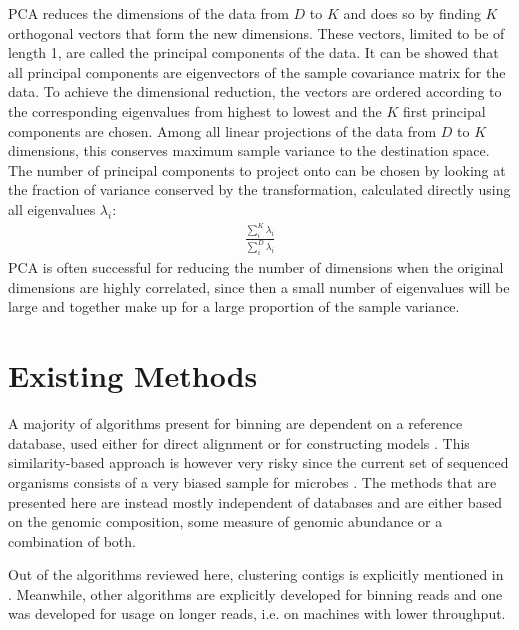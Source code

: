 PCA reduces the dimensions of the data from $D$ to $K$ and  does so by finding $K$ orthogonal vectors that form the new dimensions. These vectors, limited to be of length 1, are called the principal components of the data. It can be showed that all principal components are eigenvectors of the sample covariance matrix for the data. To achieve the dimensional reduction, the vectors are ordered according to the corresponding eigenvalues from highest to lowest and the $K$ first principal components are chosen. Among all linear projections of the data from $D$ to $K$ dimensions, this conserves maximum sample variance to the destination space. The number of principal components to project onto can be chosen by looking at the fraction of variance conserved by the transformation, calculated directly using all eigenvalues $\lambda_i$:
\begin{align*}
  \frac{\sum_i^K\lambda_i}{\sum_i^D \lambda_i}
\end{align*}
PCA is often successful for reducing the number of dimensions when the original dimensions are highly correlated, since then a small number of eigenvalues will be large and together make up for a large proportion of the sample variance. \parencite{Alpaydin2010}

\section{Existing Methods}
A majority of algorithms present for binning are dependent on a reference database, used either for direct alignment or for constructing models \parencite{Mande2012}. This similarity-based approach is however very risky since the current set of sequenced organisms consists of a very biased sample for microbes \parencite{Leung2011}. The methods that are presented here are instead mostly independent of databases and are either based on the genomic composition, some measure of genomic abundance or a combination of both. 

Out of the algorithms reviewed here, clustering contigs is explicitly mentioned in \parencite{Kelley2010,Weber2011, Wang2012, Strous2012a}. Meanwhile, other algorithms are explicitly developed for binning reads \parencite{Wu2011b,Tanaseichuk2012a} and one \parencite{Chatterji2008} was developed for usage on longer reads, i.e. on machines with lower throughput. 

